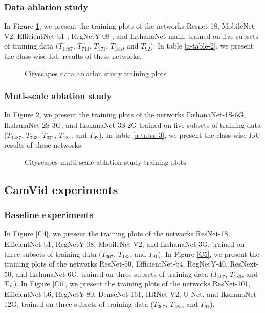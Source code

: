 \documentclass{article}
\begin{document}
\subsubsection{Data ablation study}
In Figure \ref{C2}, we present the training plots of the networks Resnet-18, MobileNet-V2, EfficientNet-b1 , RegNetY-08 , and IkshanaNet-main,  trained on five subsets of training data ($T_{1487}$, $T_{743}$, $T_{371}$, $T_{185}$, and $T_{92}$).
In table \ref{a-table-2}, we present the class-wise IoU results of these networks.  
\begin{figure}[ht]
\centering     {}
\caption{Cityscapes data ablation study training plots}
\label{C2}
\end{figure}


\subsubsection{Muti-scale ablation study}
In Figure \ref{C3}, we present the training plots of the networks IkshanaNet-1S-6G,  IkshanaNet-2S-3G, and IkshanaNet-3S-2G trained on five subsets of training data ($T_{1487}$, $T_{743}$, $T_{371}$, $T_{185}$, and $T_{92}$).\newline
In table \ref{a-table-3}, we present the class-wise IoU results of these networks. 


\begin{figure}[ht]
\centering     {}
\caption{Cityscapes multi-scale ablation study training plots}
\label{C3}
\end{figure}

\subsection{CamVid experiments}
\subsubsection{Baseline experiments}
In Figure \ref{C4}, we present the training plots of the networks ResNet-18, EfficientNet-b1, RegNetY-08, MobileNet-V2, and IkshanaNet-3G, trained on three subsets of training data ($T_{367}$, $T_{183}$, and $T_{91}$).\newline
In Figure \ref{C5}, we present the training plots of the networks ResNet-50, EfficientNet-b4, RegNetY-40, ResNext-50, and IkshanaNet-6G, trained on three subsets of training data ($T_{367}$, $T_{183}$, and $T_{91}$).\newline
In Figure \ref{C6}, we present the training plots of the networks ResNet-101, EfficientNet-b6, RegNetY-80, DenseNet-161, HRNet-V2, U-Net, and IkshanaNet-12G, trained on three subsets of training data ($T_{367}$, $T_{183}$, and $T_{91}$).\newline
\end{document}
